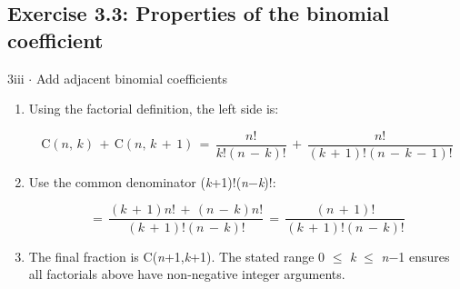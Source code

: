 \documentclass[11pt]{article}
\begin{document}
\begin{keepsection}\subsection{Exercise 3.3: Properties of the binomial coefficient}

\begin{workedbox}{3iii \ensuremath{\cdot} Add adjacent binomial coefficients}
\begin{enumerate}
\item {}
Using the factorial definition, the left side is:

\begin{equation*}\mathrm{C}({n},\, {k})\, +\, \mathrm{C}({n},\, {k}\, +\, 1)\, =\, \dfrac{{n}!}{{k}!({n}\, -\, {k})!}\, +\, \dfrac{{n}!}{({k}\, +\, 1)!({n}\, -\, {k}\, -\, 1)!}\end{equation*}
\item {}
Use the common denominator (\textit{k}+1)!(\textit{n}\ensuremath{-}\textit{k})!:

\begin{equation*}=\, \dfrac{({k}\, +\, 1){n}!\, +\, ({n}\, -\, {k}){n}!}{({k}\, +\, 1)!({n}\, -\, {k})!}\, =\, \dfrac{({n}\, +\, 1)!}{({k}\, +\, 1)!({n}\, -\, {k})!}\end{equation*}
\item The final fraction is C(\textit{n}+1,\textit{k}+1). The stated range 0 \ensuremath{\leq} \textit{k} \ensuremath{\leq} \textit{n}\ensuremath{-}1 ensures all factorials above have non-negative integer arguments.
\end{enumerate}
\end{workedbox}

\end{keepsection}
\end{document}
